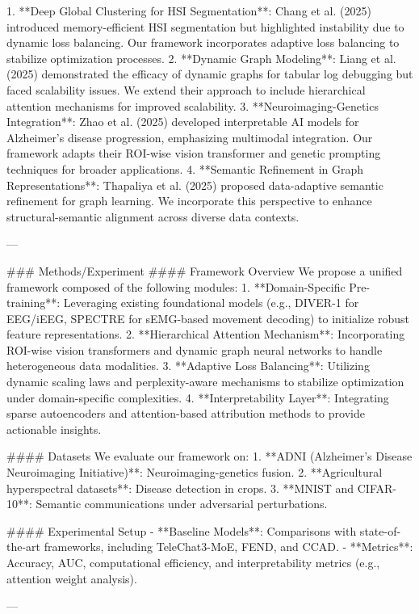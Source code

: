 1. **Deep Global Clustering for HSI Segmentation**: Chang et al. (2025) introduced memory-efficient HSI segmentation but highlighted instability due to dynamic loss balancing. Our framework incorporates adaptive loss balancing to stabilize optimization processes.  
2. **Dynamic Graph Modeling**: Liang et al. (2025) demonstrated the efficacy of dynamic graphs for tabular log debugging but faced scalability issues. We extend their approach to include hierarchical attention mechanisms for improved scalability.  
3. **Neuroimaging-Genetics Integration**: Zhao et al. (2025) developed interpretable AI models for Alzheimer's disease progression, emphasizing multimodal integration. Our framework adapts their ROI-wise vision transformer and genetic prompting techniques for broader applications.  
4. **Semantic Refinement in Graph Representations**: Thapaliya et al. (2025) proposed data-adaptive semantic refinement for graph learning. We incorporate this perspective to enhance structural-semantic alignment across diverse data contexts.

---

### Methods/Experiment  
#### Framework Overview  
We propose a unified framework composed of the following modules:  
1. **Domain-Specific Pre-training**: Leveraging existing foundational models (e.g., DIVER-1 for EEG/iEEG, SPECTRE for sEMG-based movement decoding) to initialize robust feature representations.  
2. **Hierarchical Attention Mechanism**: Incorporating ROI-wise vision transformers and dynamic graph neural networks to handle heterogeneous data modalities.  
3. **Adaptive Loss Balancing**: Utilizing dynamic scaling laws and perplexity-aware mechanisms to stabilize optimization under domain-specific complexities.  
4. **Interpretability Layer**: Integrating sparse autoencoders and attention-based attribution methods to provide actionable insights.

#### Datasets  
We evaluate our framework on:  
1. **ADNI (Alzheimer's Disease Neuroimaging Initiative)**: Neuroimaging-genetics fusion.  
2. **Agricultural hyperspectral datasets**: Disease detection in crops.  
3. **MNIST and CIFAR-10**: Semantic communications under adversarial perturbations.

#### Experimental Setup  
- **Baseline Models**: Comparisons with state-of-the-art frameworks, including TeleChat3-MoE, FEND, and CCAD.  
- **Metrics**: Accuracy, AUC, computational efficiency, and interpretability metrics (e.g., attention weight analysis).  

---

